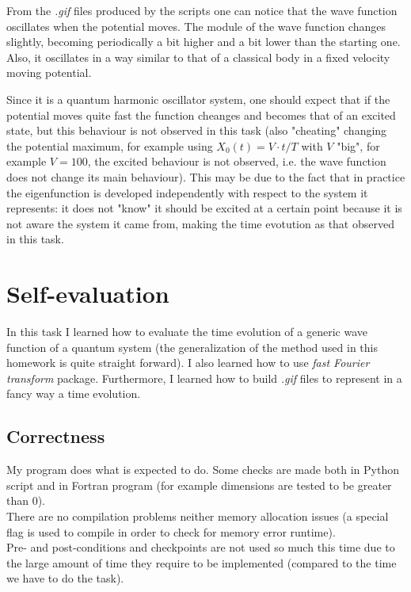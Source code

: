\documentclass[12pt, a4paper, notitlepage]{report}
\begin{document}
From the \textit{.gif} files produced by the scripts one can notice that the wave function oscillates when the potential moves. The module of the wave function changes slightly, becoming periodically a bit higher and a bit lower than the starting one. Also, it oscillates in a way similar to that of a classical body in a fixed velocity moving potential.

Since it is a quantum harmonic oscillator system, one should expect that if the potential moves quite fast the function cheanges and becomes that of an excited state, but this behaviour is not observed in this task (also "cheating" changing the potential maximum, for example using $X_0(t) = V \cdot t/T$ with $V$ "big", for example $V=100$, the excited behaviour is not observed, i.e. the wave function does not change its main behaviour). This may be due to the fact that in practice the eigenfunction is developed independently with respect to the system it represents: it does not "know" it should be excited at a certain point because it is not aware the system it came from, making the time evotution as that observed in this task.

\section*{Self-evaluation}
In this task I learned how to evaluate the time evolution of a generic wave function of a quantum system (the  generalization of the method used in this homework is quite straight forward). I also learned how to use \textit{fast Fourier transform} package. Furthermore, I learned how to build \textit{.gif} files to represent in a fancy way a time evolution.

\subsection*{Correctness}

My program does what is expected to do. Some checks are made both in Python script and in Fortran program (for example dimensions are tested to be greater than 0).\\
There are no compilation problems neither memory allocation issues (a special flag is used to compile in order to check for memory error runtime).\\
Pre- and post-conditions and checkpoints are not used so much this time due to the large amount of time they require to be implemented (compared to the time we have to do the task).
\end{document}
